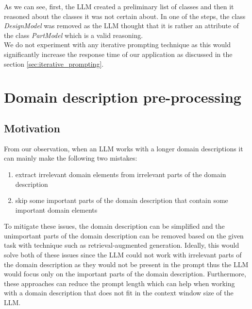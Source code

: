 As we can see, first, the LLM created a preliminary list of classes and then it reasoned about the classes it was not certain about. In one of the steps, the class \textit{DesignModel} was removed as the LLM thought that it is rather an attribute of the class \textit{PartModel} which is a valid reasoning. \\

We do not experiment with any iterative prompting technique as this would significantly increase the response time of our application as discussed in the section \ref{sec:iterative_prompting}.


\section{Domain description pre-processing}

\subsection{Motivation}

From our observation, when an LLM works with a longer domain descriptions it can mainly make the following two mistakes:

\begin{enumerate}
\item extract irrelevant domain elements from irrelevant parts of the domain description
\item skip some important parts of the domain description that contain some important domain elements
\end{enumerate}


\noindent{}To mitigate these issues, the domain description can be simplified and the unimportant parts of the domain description can be removed based on the given task with technique such as retrieval-augmented generation. Ideally, this would solve both of these issues since the LLM could not work with irrelevant parts of the domain description as they would not be present in the prompt thus the LLM would focus only on the important parts of the domain description.
Furthermore, these approaches can reduce the prompt length which can help when working with a domain description that does not fit in the context window size of the LLM.



